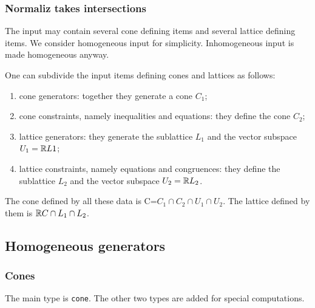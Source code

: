 \subsubsection{Normaliz takes intersections}

The input may contain several cone defining items and several lattice defining items. We consider homogeneous input for simplicity. Inhomogeneous input is made homogeneous anyway.

One can subdivide the input items defining cones and lattices as follows:
\begin{enumerate}
	\item cone generators: together they generate a cone $C_1$;
	\item cone constraints, namely inequalities and equations: they define the cone $C_2$;
	\item lattice generators: they generate the sublattice $L_1$ and the vector subspace $U_1={\mathbb R} L1$;
	\item lattice constraints, namely equations and congruences: they define the sublattice $L_2$ and the vector subspace $U_2={\mathbb R} L_2$.
\end{enumerate}

The cone defined by all these data is C=$C_1\cap C_2\cap U_1\cap U_2$. The lattice defined by them is ${\mathbb R} C\cap L_1\cap L_2$.

\subsection{Homogeneous generators}

\subsubsection{Cones}\label{cone_synt}

The main type is \verb|cone|. The other two types are added for special computations.

